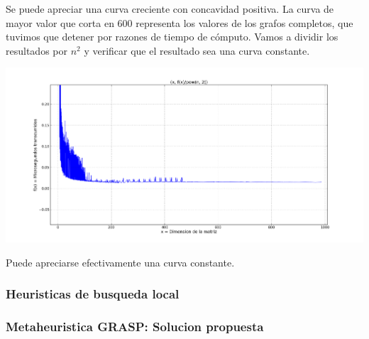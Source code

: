 Se puede apreciar una curva creciente con concavidad positiva. La curva de mayor valor que corta en 600 representa los valores de los grafos completos, que tuvimos que detener por razones de tiempo de c\'omputo. Vamos a dividir los resultados por $n^2$ y verificar que el resultado sea una curva constante.


\begin{center}
\includegraphics[scale=0.450]{img/golosa_fx2.png}
\end{center}
\vspace{2mm}

Puede apreciarse efectivamente una curva constante.

\subsubsection{Heuristicas de busqueda local}
\subsubsection{Metaheuristica GRASP: Solucion propuesta}
